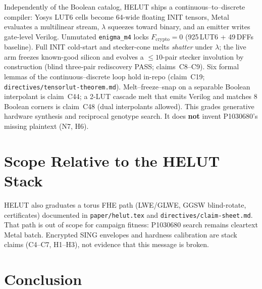 \documentclass[11pt,a4paper]{article}
\begin{document}
Independently of the Boolean catalog, HELUT ships a continuous--to--discrete
compiler: Yosys LUT6 cells become 64-wide floating INIT tensors, Metal
evaluates a multilinear stream, $\lambda$ squeezes toward binary, and an
emitter writes gate-level Verilog.
Unmutated \texttt{enigma\_m4} locks $F_{\mathrm{crypto}}=0$
(925\,LUT6 + 49\,DFFs baseline).
Full INIT cold-start and stecker-cone melts \emph{shatter} under $\lambda$;
the live arm freezes known-good silicon and evolves a $\le 10$-pair
stecker involution by construction (blind three-pair rediscovery PASS;
claims~C8--C9).
Six formal lemmas of the continuous--discrete loop hold in-repo (claim~C19;
\texttt{directives/tensorlut-theorem.md}).
Melt--freeze--snap on a separable Boolean interpolant is claim~C44;
a 2-LUT cascade melt that emits Verilog and matches 8 Boolean corners is
claim~C48 (dual interpolants allowed).
This grades generative hardware synthesis and reciprocal genotype search.
It does \textbf{not} invent P1030680's missing plaintext (N7, H6).

\section{Scope Relative to the HELUT Stack}

HELUT also graduates a torus FHE path (LWE/GLWE, GGSW blind-rotate,
certificates) documented in \texttt{paper/helut.tex} and
\texttt{directives/claim-sheet.md}.
That path is out of scope for campaign fitness: P1030680 search remains
cleartext Metal batch.
Encrypted SING envelopes and hardness calibration are stack claims
(C4--C7, H1--H3), not evidence that this message is broken.

\section{Conclusion}
\end{document}
